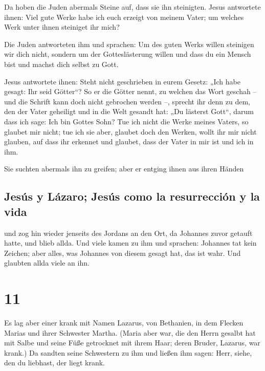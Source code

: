  Da hoben die Juden abermals Steine auf, dass sie ihn
steinigten.  Jesus antwortete ihnen: Viel gute Werke habe
ich euch erzeigt von meinem Vater; um welches Werk unter ihnen steiniget
ihr mich?

 Die Juden antworteten ihm und sprachen: Um des guten
Werks willen steinigen wir dich nicht, sondern um der Gotteslästerung
willen und dass du ein Mensch bist und machst dich selbst zu Gott.

 Jesus antwortete ihnen: Steht nicht geschrieben in eurem
Gesetz: „Ich habe gesagt: Ihr seid Götter``?  So er die
Götter nennt, zu welchen das Wort geschah -- und die Schrift kann doch
nicht gebrochen werden --,  sprecht ihr denn zu dem, den
der Vater geheiligt und in die Welt gesandt hat: „Du lästerst Gott``,
darum dass ich sage: Ich bin Gottes Sohn?  Tue ich nicht
die Werke meines Vaters, so glaubet mir nicht;  tue ich
sie aber, glaubet doch den Werken, wollt ihr mir nicht glauben, auf dass
ihr erkennet und glaubet, dass der Vater in mir ist und ich in ihm.

 Sie suchten abermals ihn zu greifen; aber er entging
ihnen aus ihren Händen

\hypertarget{jesuxfas-y-luxe1zaro-jesuxfas-como-la-resurrecciuxf3n-y-la-vida}{%
\subsection{Jesús y Lázaro; Jesús como la resurrección y la
vida}\label{jesuxfas-y-luxe1zaro-jesuxfas-como-la-resurrecciuxf3n-y-la-vida}}

 und zog hin wieder jenseits des Jordans an den Ort, da
Johannes zuvor getauft hatte, und blieb allda.  Und viele
kamen zu ihm und sprachen: Johannes tat kein Zeichen; aber alles, was
Johannes von diesem gesagt hat, das ist wahr.  Und
glaubten allda viele an ihn.

\hypertarget{section-10}{%
\section{11}\label{section-10}}

 Es lag aber einer krank mit Namen Lazarus, von Bethanien,
in dem Flecken Marias und ihrer Schwester Martha.  (Maria
aber war, die den Herrn gesalbt hat mit Salbe und seine Füße getrocknet
mit ihrem Haar; deren Bruder, Lazarus, war krank.)  Da
sandten seine Schwestern zu ihm und ließen ihm sagen: Herr, siehe, den
du liebhast, der liegt krank.

